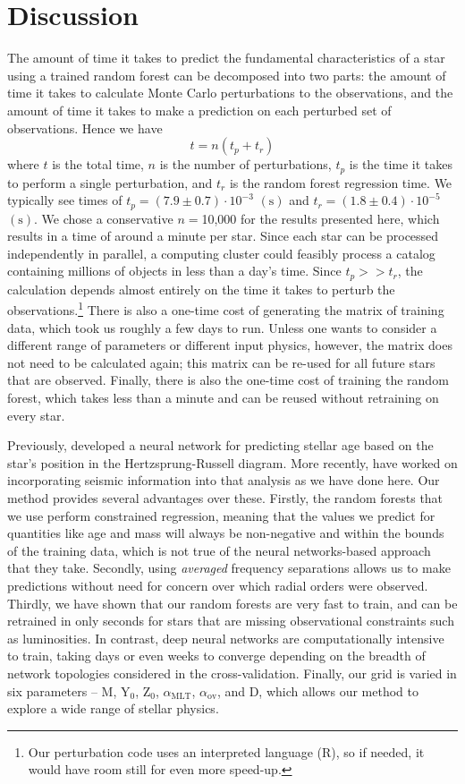 \documentclass[manuscript]{aastex}
\begin{document}
\section{Discussion}
The amount of time it takes to predict the fundamental characteristics of a star using a trained random forest can be decomposed into two parts: the amount of time it takes to calculate Monte Carlo perturbations to the observations, and the amount of time it takes to make a prediction on each perturbed set of observations. Hence we have
\begin{equation}
    t = n(t_p + t_r)
\end{equation}
where $t$ is the total time, $n$ is the number of perturbations, $t_p$ is the time it takes to perform a single perturbation, and $t_r$ is the random forest regression time. We typically see times of $t_p = (7.9 \pm 0.7) \cdot 10^{-3}$ $(\si{\s})$ and $t_r = (1.8 \pm 0.4) \cdot 10^{-5}$ $(\si{\s})$. We chose a conservative $n=$10,000 for the results presented here, which results in a time of around a minute per star. Since each star can be processed independently in parallel, a computing cluster could feasibly process a catalog containing millions of objects in less than a day's time. Since $t_p >> t_r$, the calculation depends almost entirely on the time it takes to perturb the observations.\footnote{Our perturbation code uses an interpreted language (R), so if needed, it would have room still for even more speed-up.} There is also a one-time cost of generating the matrix of training data, which took us roughly a few days to run. Unless one wants to consider a different range of parameters or different input physics, however, the matrix does not need to be calculated again; this matrix can be re-used for all future stars that are observed. Finally, there is also the one-time cost of training the random forest, which takes less than a minute and can be reused without retraining on every star. 

Previously, \citet{pulone1997age} developed a neural network for predicting stellar age based on the star's position in the Hertzsprung-Russell diagram. More recently, \citet{2016arXiv160200902V} have worked on incorporating seismic information into that analysis as we have done here. Our method provides several advantages over these. Firstly, the random forests that we use perform constrained regression, meaning that the values we predict for quantities like age and mass will always be non-negative and within the bounds of the training data, which is not true of the neural networks-based approach that they take. Secondly, using \emph{averaged} frequency separations allows us to make predictions without need for concern over which radial orders were observed. Thirdly, we have shown that our random forests are very fast to train, and can be retrained in only seconds for stars that are missing observational constraints such as luminosities. In contrast, deep neural networks are computationally intensive to train, taking days or even weeks to converge depending on the breadth of network topologies considered in the cross-validation. Finally, our grid is varied in six parameters -- M, Y$_0$, Z$_0$, $\alpha_{\text{MLT}}$, $\alpha_{\text{ov}}$, and D, which allows our method to explore a wide range of stellar physics.
\end{document}

